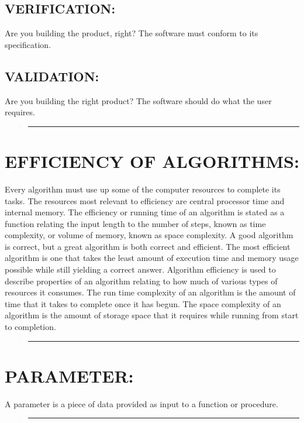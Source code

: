 \documentclass[10pt,english]{article}
\begin{document}
\subsection{VERIFICATION:}

Are you building the product, right? The software must conform to
its specification. 

\subsection{VALIDATION: }

Are you building the right product? The software should do what the
user requires.
\begin{verse}
\rule[0.5ex]{1\columnwidth}{1pt}
\end{verse}

\section{EFFICIENCY OF ALGORITHMS: }

Every algorithm must use up some of the computer resources to complete
its tasks. The resources most relevant to efficiency are central processor
time and internal memory. The efficiency or running time of an algorithm
is stated as a function relating the input length to the number of
steps, known as time complexity, or volume of memory, known as space
complexity. A good algorithm is correct, but a great algorithm is
both correct and efficient. The most efficient algorithm is one that
takes the least amount of execution time and memory usage possible
while still yielding a correct answer. Algorithm efficiency is used
to describe properties of an algorithm relating to how much of various
types of resources it consumes. The run time complexity of an algorithm
is the amount of time that it takes to complete once it has begun.
The space complexity of an algorithm is the amount of storage space
that it requires while running from start to completion.
\begin{verse}
\rule[0.5ex]{1\columnwidth}{1pt}
\end{verse}

\section{PARAMETER:}

A parameter is a piece of data provided as input to a function or
procedure.
\begin{verse}
\rule[0.5ex]{1\columnwidth}{1pt}
\end{verse}
\end{document}
